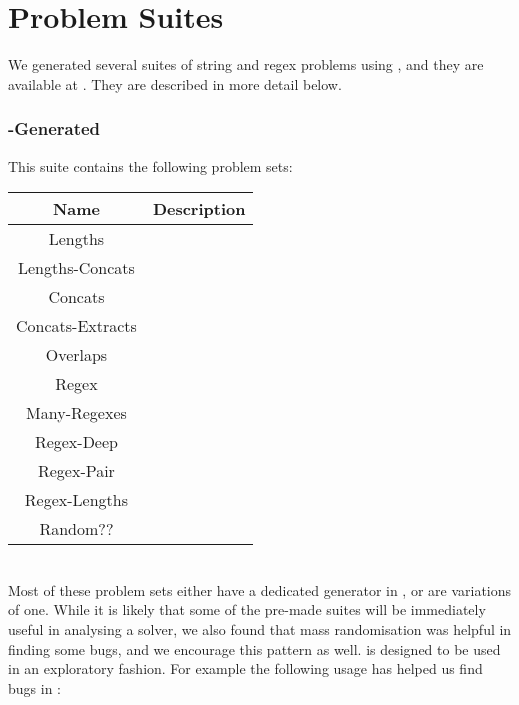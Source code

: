 \section{Problem Suites}

    We generated several suites of string and regex problems using \fuzzer{}, and they are available at \problemRepo{}. They are described in more detail below.

    \subsubsection{\fuzzer{}-Generated}

        This suite contains the following problem sets: \\

        \begin{tabular}{|c|c|}
            \hline
            \textbf{Name}    & \textbf{Description} \\ \hline
            Lengths          & \todo{} \\ \hline
            Lengths-Concats  & \todo{} \\ \hline
            Concats          & \todo{} \\ \hline
            Concats-Extracts & \todo{} \\ \hline
            Overlaps         & \todo{} \\ \hline
            Regex            & \todo{} \\ \hline
            Many-Regexes     & \todo{} \\ \hline
            Regex-Deep       & \todo{} \\ \hline
            Regex-Pair       & \todo{} \\ \hline
            Regex-Lengths    & \todo{} \\ \hline
            Random??         & \todo{} \\ \hline
        \end{tabular}

        \hfill \\

        Most of these problem sets either have a dedicated generator in \generator{}, or are variations of one. While it is likely that some of the pre-made suites will be immediately useful in analysing a solver, we also found that mass randomisation was helpful in finding some bugs, and we encourage this pattern as well. \generator{} is designed to be used in an exploratory fashion. For example the following usage has helped us find bugs in \us{}:

